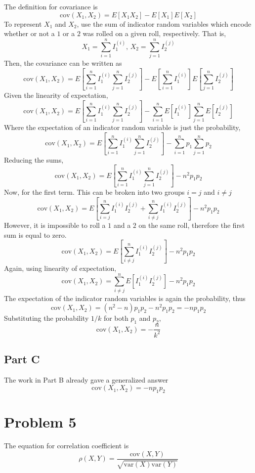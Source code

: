 \documentclass{article}
\begin{document}
The definition for covariance is 
$$ \mathrm{cov}(X_1, X_2) = E[X_1 X_2] - E[X_1] E[X_2] $$
To represent $X_1$ and $X_2$, use the sum of indicator random variables which
encode whether or not a $1$ or a $2$ was rolled on a given roll,
respectively. That is,
$$ X_1 = \sum_{i = 1}^n I_1^{(i)},\, X_2 = \sum_{j = 1}^n I_2^{(j)} $$
Then, the covariance can be written as
$$ \mathrm{cov}(X_1, X_2) = E\left[\sum_{i = 1}^n I_1^{(i)} \sum_{j = 1}^n
I_2^{(j)}\right] - E\left[\sum_{i = 1}^n I_1^{(i)}\right] E\left[\sum_{j =
1}^n I_2^{(j)}\right] $$
Given the linearity of expectation,
$$ \mathrm{cov}(X_1, X_2) = E\left[\sum_{i = 1}^n I_1^{(i)} \sum_{j = 1}^n
I_2^{(j)}\right] - \sum_{i = 1}^n E\left[I_1^{(i)}\right] \sum_{j = 1}^n
E\left[I_2^{(j)}\right] $$
Where the expectation of an indicator random variable is just the probability,
$$ \mathrm{cov}(X_1, X_2) = E\left[\sum_{i = 1}^n I_1^{(i)} \sum_{j = 1}^n
I_2^{(j)}\right] - \sum_{i = 1}^n p_1 \sum_{j = 1}^n p_2 $$
Reducing the sums,
$$ \mathrm{cov}(X_1, X_2) = E\left[\sum_{i = 1}^n I_1^{(i)} \sum_{j = 1}^n
I_2^{(j)}\right] - n^2 p_1 p_2 $$
Now, for the first term. This can be broken into two groups $i = j$ and $i
\neq j$
$$ \mathrm{cov}(X_1, X_2) = E\left[\sum_{i = j}^n I_1^{(i)} I_2^{(j)} +
\sum_{i \neq j}^n I_1^{(i)} I_2^{(j)}\right] - n^2 p_1 p_2 $$
However, it is impossible to roll a $1$ and a $2$ on the same roll, therefore
the first sum is equal to zero.
$$ \mathrm{cov}(X_1, X_2) = E\left[\sum_{i \neq j}^n I_1^{(i)}
I_2^{(j)}\right] - n^2 p_1 p_2 $$
Again, using linearity of expectation,
$$ \mathrm{cov}(X_1, X_2) = \sum_{i \neq j}^n E\left[I_1^{(i)}
I_2^{(j)}\right] - n^2 p_1 p_2 $$
The expectation of the indicator random variables is again the probability, thus
$$ \mathrm{cov}(X_1, X_2) = (n^2 - n) p_1 p_2 - n^2 p_1 p_2 = -n p_1 p_2 $$
Substituting the probability $1/k$ for both $p_1$ and $p_2$,
$$ \mathrm{cov}(X_1, X_2) = -\frac{n}{k^2} $$

\subsection*{Part C}

The work in Part B already gave a generalized answer
$$ \mathrm{cov}(X_1, X_2) = -n p_1 p_2 $$

\section*{Problem 5}

The equation for correlation coefficient is
$$ \rho(X, Y) = \frac{\mathrm{cov}(X,
Y)}{\sqrt{\mathrm{var}(X)\mathrm{var}(Y)}} $$
\end{document}
